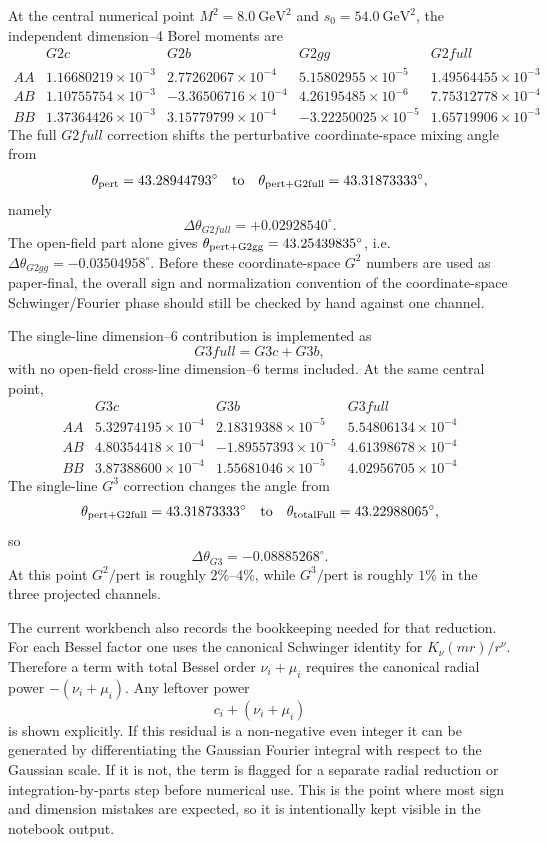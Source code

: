 \documentclass[11pt]{article}
\begin{document}
At the central numerical point \(M^2=8.0~\mathrm{GeV}^2\) and
\(s_0=54.0~\mathrm{GeV}^2\), the independent dimension--4 Borel moments are
\[
\begin{array}{c|rrrr}
 &G2c&G2b&G2gg&G2full\\ \hline
AA&
1.16680219\times10^{-3}&
2.77262067\times10^{-4}&
5.15802955\times10^{-5}&
1.49564455\times10^{-3}\\
AB&
1.10755754\times10^{-3}&
-3.36506716\times10^{-4}&
4.26195485\times10^{-6}&
7.75312778\times10^{-4}\\
BB&
1.37364426\times10^{-3}&
3.15779799\times10^{-4}&
-3.22250025\times10^{-5}&
1.65719906\times10^{-3}
\end{array}
\]
The full \(G2full\) correction shifts the perturbative coordinate-space mixing
angle from
\[
  \theta_{\rm pert}=43.28944793^\circ
  \quad\text{to}\quad
  \theta_{\rm pert+G2full}=43.31873333^\circ,
\]
namely
\[
  \Delta\theta_{G2full}=+0.02928540^\circ .
\]
The open-field part alone gives
\(\theta_{\rm pert+G2gg}=43.25439835^\circ\), i.e.
\(\Delta\theta_{G2gg}=-0.03504958^\circ\).  Before these coordinate-space
\(G^2\) numbers are used as paper-final, the overall sign and normalization
convention of the coordinate-space Schwinger/Fourier phase should still be
checked by hand against one channel.

The single-line dimension--6 contribution is implemented as
\[
  G3full=G3c+G3b,
\]
with no open-field cross-line dimension--6 terms included.  At the same
central point,
\[
\begin{array}{c|rrr}
 &G3c&G3b&G3full\\ \hline
AA&
5.32974195\times10^{-4}&
2.18319388\times10^{-5}&
5.54806134\times10^{-4}\\
AB&
4.80354418\times10^{-4}&
-1.89557393\times10^{-5}&
4.61398678\times10^{-4}\\
BB&
3.87388600\times10^{-4}&
1.55681046\times10^{-5}&
4.02956705\times10^{-4}
\end{array}
\]
The single-line \(G^3\) correction changes the angle from
\[
  \theta_{\rm pert+G2full}=43.31873333^\circ
  \quad\text{to}\quad
  \theta_{\rm totalFull}=43.22988065^\circ,
\]
so
\[
  \Delta\theta_{G3}=-0.08885268^\circ .
\]
At this point \(G^2/\mathrm{pert}\) is roughly \(2\%\)--\(4\%\), while
\(G^3/\mathrm{pert}\) is roughly \(1\%\) in the three projected channels.

The current workbench also records the bookkeeping needed for that reduction.
For each Bessel factor one uses the canonical Schwinger identity for
\(K_\nu(mr)/r^\nu\).  Therefore a term with total Bessel order
\(\nu_i+\mu_i\) requires the canonical radial power
\(-(\nu_i+\mu_i)\).  Any leftover power
\[
  c_i+(\nu_i+\mu_i)
\]
is shown explicitly.  If this residual is a non-negative even integer it can be
generated by differentiating the Gaussian Fourier integral with respect to the
Gaussian scale.  If it is not, the term is flagged for a separate radial
reduction or integration-by-parts step before numerical use.  This is the point
where most sign and dimension mistakes are expected, so it is intentionally
kept visible in the notebook output.
\end{document}
